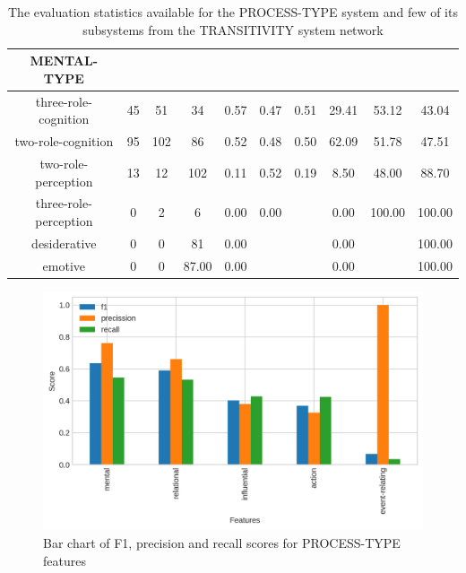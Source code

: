 \begin{table}[!ht]
{\begin{tabular}{|c|c|c|c|c|c|c|c|c|c|}
        MENTAL-TYPE &  &  &  &  &  &  &  &  &  \\ \hline
        three-role-cognition & 45 & 51 & 34 & 0.57 & 0.47 & 0.51 & 29.41 & 53.12 & 43.04 \\ \hline
        two-role-cognition & 95 & 102 & 86 & 0.52 & 0.48 & 0.50 & 62.09 & 51.78 & 47.51 \\ \hline
        two-role-perception & 13 & 12 & 102 & 0.11 & 0.52 & 0.19 & 8.50 & 48.00 & 88.70 \\ \hline
        three-role-perception & 0 & 2 & 6 & 0.00 & 0.00 &  & 0.00 & 100.00 & 100.00 \\ \hline
        desiderative & 0 & 0 & 81 & 0.00 &  &  & 0.00 &  & 100.00 \\ \hline
        emotive & 0 & 0 & 87.00 & 0.00 &  &  & 0.00 &  & 100.00 \\ \hline
    \end{tabular}
    }
    \caption{The evaluation statistics available for the PROCESS-TYPE system and few of its subsystems from the TRANSITIVITY system network}
    \label{tab:features-transitivity}
\end{table}

\begin{figure}[!ht]
    \centering
    \includegraphics[width=.65\textwidth]{evaluation-results/figures/accuracy-semantic-process-type-f1}
    \caption{Bar chart of F1, precision and recall scores for PROCESS-TYPE features}
    \label{fig:process-types}
\end{figure}

